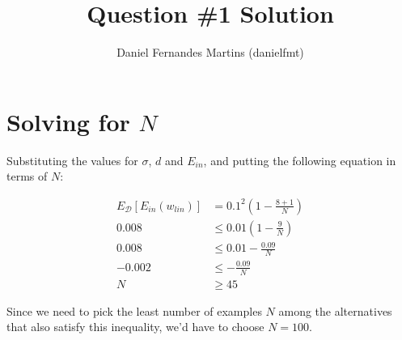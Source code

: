 \documentclass{article}
\author{Daniel Fernandes Martins (danielfmt)}
\title{Question \#1 Solution}
\begin{document}
\maketitle

\section{Solving for $N$}

Substituting the values for $\sigma$, $d$ and $E_{in}$, and putting the
following equation in terms of $N$:


\begin{align*}
E_\mathcal{D}[E_{in}(w_{lin})] &= 0.1^2 \left(1 - \frac{8+1}{N} \right) \\
0.008 &\leq 0.01 \left(1 - \frac{9}{N} \right) \\
0.008 &\leq 0.01 - \frac{0.09}{N} \\
-0.002 &\leq - \frac{0.09}{N} \\
N &\geq 45
\end{align*}

Since we need to pick the least number of examples $N$ among the alternatives
that also satisfy this inequality, we'd have to choose $N=100$.
\end{document}
